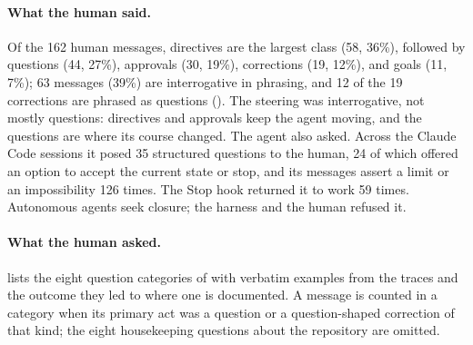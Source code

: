 \paragraph{What the human said.} Of the 162 human messages, directives are the largest class (58,
36\%), followed by questions (44, 27\%), approvals (30, 19\%), corrections (19, 12\%), and goals
(11, 7\%); 63 messages (39\%) are interrogative in phrasing, and 12 of the 19 corrections are
phrased as questions (). The steering was interrogative, not mostly questions:
directives and approvals keep the agent moving, and the questions are where its course changed. The
agent also asked. Across the Claude Code sessions it
posed 35 structured questions to the human, 24 of which offered an option to accept the current
state or stop, and its messages assert a limit or an impossibility 126 times. The Stop hook returned
it to work 59 times. Autonomous agents seek closure; the harness and the human refused it.

\paragraph{What the human asked.}  lists the eight question
categories of  with verbatim examples from the traces and
the outcome they led to where one is documented. A message is counted in a category when its primary
act was a question or a question-shaped correction of that kind; the eight housekeeping questions
about the repository are omitted.

